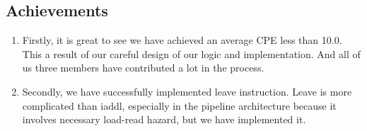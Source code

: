 \documentclass{article}
\begin{document}
\subsection{Achievements}

\begin{enumerate}
  \item Firstly, it is great to see we have achieved an average CPE less than 10.0. This a result of our careful design of our logic and implementation. And all of us three members have contributed a lot in the process.
  \item Secondly, we have successfully implemented leave instruction. Leave is more complicated than iaddl, especially in the pipeline architecture because it involves necessary load-read hazard, but we have implemented it.
\end{enumerate}



\end{document}
